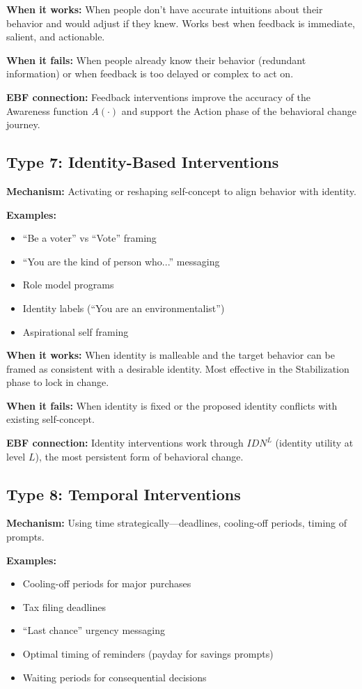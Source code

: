 \textbf{When it works:} When people don't have accurate intuitions about their behavior and would adjust if they knew. Works best when feedback is immediate, salient, and actionable.

\textbf{When it fails:} When people already know their behavior (redundant information) or when feedback is too delayed or complex to act on.

\textbf{EBF connection:} Feedback interventions improve the accuracy of the Awareness function $A(\cdot)$ and support the Action phase of the behavioral change journey.

\subsection{Type 7: Identity-Based Interventions}

\textbf{Mechanism:} Activating or reshaping self-concept to align behavior with identity.

\textbf{Examples:}
\begin{itemize}[nosep]
\item ``Be a voter'' vs ``Vote'' framing \citep{bryan2011}
\item ``You are the kind of person who...'' messaging
\item Role model programs
\item Identity labels (``You are an environmentalist'')
\item Aspirational self framing
\end{itemize}

\textbf{When it works:} When identity is malleable and the target behavior can be framed as consistent with a desirable identity. Most effective in the Stabilization phase to lock in change.

\textbf{When it fails:} When identity is fixed or the proposed identity conflicts with existing self-concept.

\textbf{EBF connection:} Identity interventions work through $IDN^L$ (identity utility at level $L$), the most persistent form of behavioral change.

\subsection{Type 8: Temporal Interventions}

\textbf{Mechanism:} Using time strategically---deadlines, cooling-off periods, timing of prompts.

\textbf{Examples:}
\begin{itemize}[nosep]
\item Cooling-off periods for major purchases
\item Tax filing deadlines
\item ``Last chance'' urgency messaging
\item Optimal timing of reminders (payday for savings prompts)
\item Waiting periods for consequential decisions
\end{itemize}

